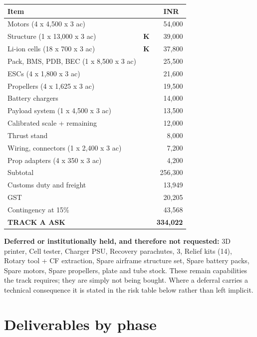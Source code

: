 \documentclass[11pt,a4paper]{article}
\newcommand{\inr}[1]{INR~#1}
\begin{document}
\begin{center}
\begin{tabular}{@{}p{88mm}cr@{}}
\toprule
\textbf{Item} & & \textbf{\inr{}} \\
\midrule
Motors (4 x 4,500 x 3 ac) &  & 54,000 \\
Structure (1 x 13,000 x 3 ac) & \textbf{K} & 39,000 \\
Li-ion cells (18 x 700 x 3 ac) & \textbf{K} & 37,800 \\
Pack, BMS, PDB, BEC (1 x 8,500 x 3 ac) &  & 25,500 \\
ESCs (4 x 1,800 x 3 ac) &  & 21,600 \\
Propellers (4 x 1,625 x 3 ac) &  & 19,500 \\
Battery chargers &  & 14,000 \\
Payload system (1 x 4,500 x 3 ac) &  & 13,500 \\
Calibrated scale + remaining &  & 12,000 \\
Thrust stand &  & 8,000 \\
Wiring, connectors (1 x 2,400 x 3 ac) &  & 7,200 \\
Prop adapters (4 x 350 x 3 ac) &  & 4,200 \\
\midrule
Subtotal & & 256,300 \\
Customs duty and freight & & 13,949 \\
GST & & 20,205 \\
Contingency at 15\% & & 43,568 \\
\midrule
\textbf{TRACK A ASK} & & \textbf{334,022} \\
\bottomrule
\end{tabular}
\end{center}


\textbf{Deferred or institutionally held, and therefore not requested:}
3D printer, Cell tester, Charger PSU, Recovery parachutes, 3, Relief kits (14), Rotary tool + CF extraction, Spare airframe structure set, Spare battery packs, Spare motors, Spare propellers, plate and tube stock. These remain capabilities the track requires; they are simply not being
bought. Where a deferral carries a technical consequence it is stated in the
risk table below rather than left implicit.

\section{Deliverables by phase}
\end{document}
